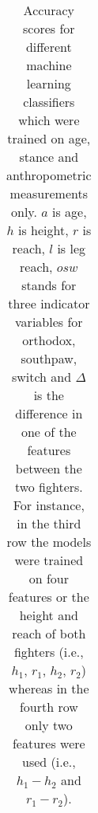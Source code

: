 \begin{center}
\begin{table}[h]
\begin{tabular}{r|cccc}
  \bottomrule
\end{tabular}
\caption{Accuracy scores for different machine learning classifiers which were trained
on age, stance and anthropometric measurements only.
$a$ is age, $h$ is height, $r$ is reach, $l$ is leg reach,
$osw$ stands for three indicator variables for orthodox, southpaw,
switch and $\Delta$ is the difference in one of the features between the two
fighters. For instance, in the third row the models were trained on
four features or the height and reach of both fighters (i.e., $h_1$, $r_1$, $h_2$, $r_2$)
whereas in the fourth row only two features were used (i.e., $h_1-h_2$ and $r_1-r_2$).}
\label{anthropomorphic_features}
\end{table}
\end{center}



